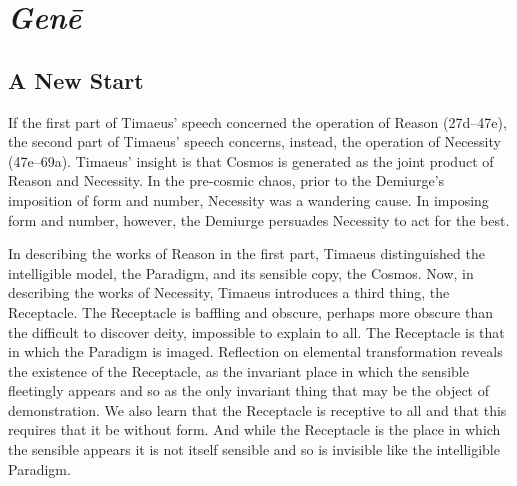 
\chapter{\emph{Genē}} %
\label{cha:gene}

\section{A New Start} %
\label{sec:a_new_start}

If the first part of Timaeus' speech concerned the operation of Reason (27d--47e), the second part of Timaeus' speech concerns, instead, the operation of Necessity (47e--69a). Timaeus' insight is that Cosmos is generated as the joint product of Reason and Necessity. In the pre-cosmic chaos, prior to the Demiurge's imposition of form and number, Necessity was a wandering cause. In imposing form and number, however, the Demiurge persuades Necessity to act for the best.


In describing the works of Reason in the first part, Timaeus distinguished the intelligible model, the Paradigm, and its sensible copy, the Cosmos. Now, in describing the works of Necessity, Timaeus introduces a third thing, the Receptacle. The Receptacle is baffling and obscure, perhaps more obscure than the difficult to discover deity, impossible to explain to all. The Receptacle is that in which the Paradigm is imaged. Reflection on elemental transformation reveals the existence of the Receptacle, as the invariant place in which the sensible fleetingly appears and so as the only invariant thing that may be the object of demonstration. We also learn that the Receptacle is receptive to all and that this requires that it be without form. And while the Receptacle is the place in which the sensible appears it is not itself sensible and so is invisible like the intelligible Paradigm.

